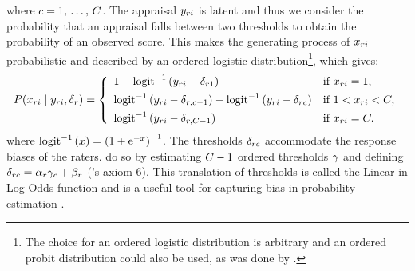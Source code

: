 \documentclass[a4paper,usenames,dvipsnames]{article}
\begin{document}
where $\Incat = 1,\,\dots,\,\Tncat$. The appraisal $y_{ri}$ is latent and thus we consider the probability that an appraisal falls between two thresholds to obtain the probability of an observed score. This makes the generating process of $x_{ri}$ probabilistic and described by an ordered logistic distribution\footnote{The choice for an ordered logistic distribution is arbitrary and an ordered probit distribution could also be used, as was done by \AB{}.}, which gives:
\begin{align*}
P(x_{\Irater\Iitem}\mid  \Appraisal_{\Irater\Iitem},\delta_{\Irater}) = 
\left\{\begin{array}{ll} 
1 - \ilogit{\Appraisal_{\Irater\Iitem} - \Threshold_{\Irater 1}}         & \text{if } x_{\Irater\Iitem} = 1, \\[4pt]
	\ilogit{\Appraisal_{\Irater\Iitem} - \Threshold_{\Irater,\Incat-1}} - 
	\ilogit{\Appraisal_{\Irater\Iitem} - \Threshold_{\Irater\Incat}}         & \text{if } 1 < x_{\Irater\Iitem} < \Tncat,\\[4pt]
	\ilogit{\Appraisal_{\Irater\Iitem} - \Threshold_{\Irater,\Tncat-1}}       & \text{if } x_{\Irater\Iitem} = \Tncat. 
\end{array} \right.
\end{align*}
where $\text{logit}^{-1}\left(x\right) = \left(1 + \mathrm{e}^{-x}\right)^{-1}$. The thresholds $\delta_{rc}$ accommodate the response biases of the raters. \AB{} do so by estimating $\Tncat-1$ ordered thresholds $\gamma$ and defining $\delta_{rc} = \alpha_r \gamma_c + \beta_r$ (\AB{}'s axiom 6). This translation of thresholds is called the Linear in Log Odds function and is a useful tool for capturing bias in probability estimation \cite{Fox1995, Gonzalez1999, Anders2015cultural}.
\end{document}
